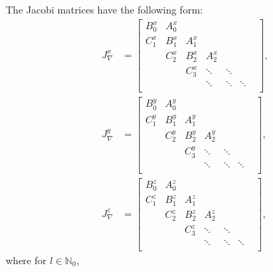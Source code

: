 \documentclass[11pt, oneside]{article}   	%
\newcommand{\No}{\mathbb{N}_0}
\begin{document}
The Jacobi matrices have the following form:
\begin{align}
J_\nabla^x &= \begin{bmatrix}
		B^x_0 & A^x_0 & & & & \\
		C^x_1 & B^x_1 & A^x_1 & & & \\
		& C^x_2 & B^x_2 & A^x_2  & & & \\
		& & C^x_3 & \ddots & \ddots & \\
		& & & \ddots & \ddots & \ddots \\
	\end{bmatrix}, \\
J_\nabla^y &= \begin{bmatrix}
		B^y_0 & A^y_0 & & & & \\
		C^y_1 & B^y_1 & A^y_1 & & & \\
		& C^y_2 & B^y_2 & A^y_2  & & & \\
		& & C^y_3 & \ddots & \ddots & \\
		& & & \ddots & \ddots & \ddots \\
	\end{bmatrix}, \\
J_\nabla^z &= \begin{bmatrix}
		B^z_0 & A^z_0 & & & & \\
		C^z_1 & B^z_1 & A^z_1 & & & \\
		& C^z_2 & B^z_2 & A^z_2  & & & \\
		& & C^z_3 & \ddots & \ddots & \\
		& & & \ddots & \ddots & \ddots \\
	\end{bmatrix},
\end{align}
where for \(l \in \No\),
\end{document}
